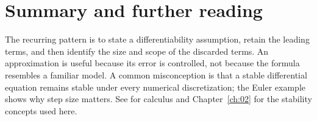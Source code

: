 \section*{Summary and further reading}
The recurring pattern is to state a differentiability assumption, retain the leading terms, and then identify the size and scope of the discarded terms. An approximation is useful because its error is controlled, not because the formula resembles a familiar model. A common misconception is that a stable differential equation remains stable under every numerical discretization; the Euler example shows why step size matters. See \citet{ev_strang1991} for calculus and Chapter~\ref{ch:02} for the stability concepts used here.
